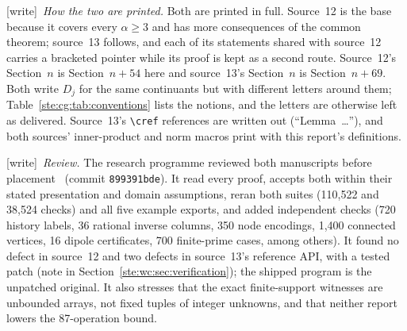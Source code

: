 \documentclass[11pt,letterpaper]{article}
\theoremstyle{definition}
\theoremstyle{remark}
\newcommand{\wtag}{\textup{[write]}}
\begin{document}
\wtag\ \emph{How the two are printed.} Both are printed in full. Source~12 is the base because it covers every $\alpha\geq3$ and has more consequences of the common theorem; source~13 follows, and each of its statements shared with source~12 carries a bracketed pointer while its proof is kept as a second route. Source~12's Section~$n$ is Section~$n+54$ here and source~13's Section~$n$ is Section~$n+69$. Both write $D_j$ for the same continuants but with different letters around them; Table~\ref{ste:cg:tab:conventions} lists the notions, and the letters are otherwise left as delivered. Source~13's \texttt{\textbackslash cref} references are written out (``Lemma~\ldots''), and both sources' inner-product and norm macros print with this report's definitions.

\wtag\ \emph{Review.} The research programme reviewed both manuscripts before placement~\cite{reviewCG} (commit \texttt{899391bde}). It read every proof, accepts both within their stated presentation and domain assumptions, reran both suites (110,522 and 38,524 checks) and all five example exports, and added independent checks (720 history labels, 36 rational inverse columns, 350 node encodings, 1,400 connected vertices, 16 dipole certificates, 700 finite-prime cases, among others). It found no defect in source~12 and two defects in source~13's reference API, with a tested patch (note in Section~\ref{ste:wc:sec:verification}); the shipped program is the unpatched original. It also stresses that the exact finite-support witnesses are unbounded arrays, not fixed tuples of integer unknowns, and that neither report lowers the 87-operation bound.
\end{document}
